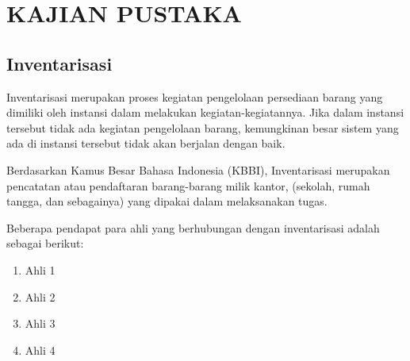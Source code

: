 
\chapter{KAJIAN PUSTAKA} 

\section{Inventarisasi}

Inventarisasi merupakan proses kegiatan pengelolaan persediaan barang yang dimiliki oleh instansi dalam melakukan kegiatan-kegiatannya. Jika dalam instansi tersebut tidak ada kegiatan pengelolaan barang, kemungkinan besar sistem yang ada di instansi tersebut tidak akan berjalan dengan baik.

Berdasarkan Kamus Besar Bahasa Indonesia (KBBI), Inventarisasi merupakan pencatatan atau pendaftaran barang-barang milik kantor, (sekolah, rumah tangga, dan sebagainya) yang dipakai dalam melaksanakan tugas.

Beberapa pendapat para ahli yang berhubungan dengan inventarisasi adalah sebagai berikut:
\begin{enumerate}
	\item Ahli 1
	\item Ahli 2
	\item Ahli 3
	\item Ahli 4
\end{enumerate}

